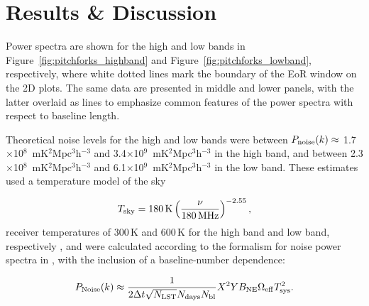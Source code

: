 \documentclass[twocolumn, trackchanges]{aastex61}
\begin{document}
\section{Results \& Discussion}
\label{sec:results}


Power spectra are shown for the high and low bands in Figure~\ref{fig:pitchforks_highband} and Figure~\ref{fig:pitchforks_lowband}, respectively, where white dotted lines mark the boundary of the EoR window on the 2D plots.  The same data are presented in middle and lower panels, with the latter overlaid as lines to emphasize common features of the power spectra with respect to baseline length. 

Theoretical noise levels for the high and low bands were between 
$P_{\rm noise}(k)\approx$ 1.7$\times$10$^8$ \,mK$^2$Mpc$^3$h$^{-3}$ and 3.4$\times$10$^9$ \,mK$^2$Mpc$^3$h$^{-3}$ in the high band, and between 2.3$\times$10$^8$ \,mK$^2$Mpc$^3$h$^{-3}$ and 6.1$\times$10$^9$ \,mK$^2$Mpc$^3$h$^{-3}$ in the low band. These estimates used a temperature model of the sky

\begin{equation}
T_{\rm sky} = 180\,{\rm K} \left(\frac{\nu}{180\,{\rm MHz}}\right)^{-2.55},
\end{equation}
 receiver temperatures of 300\,K and 600\,K for the high band and low band, respectively \citep[][also see the public \href{http://reionization.org/wp-content/uploads/2017/04/HERA19_Tsys_3April2017.pdf}{}]{deBoer17}, and were calculated according to the formalism for noise power spectra in \cite{Parsons.12a}, with the inclusion of a baseline-number dependence:

\begin{equation}
P_{\rm Noise}(k) \approx \frac{1}{2\Delta t \sqrt{N_{\rm LST}} N_{\rm days} N_{\rm bl}} X^2 Y B_{\rm NE} \Omega_{\rm eff} T_{\rm sys}^2.
\end{equation}
\end{document}
